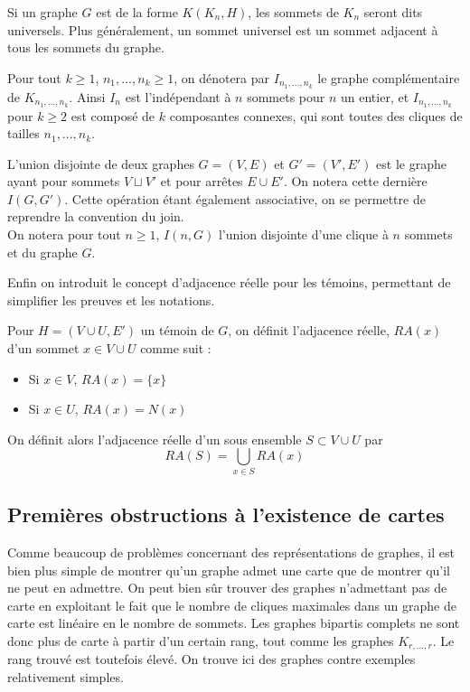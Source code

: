 \documentclass{scrartcl}
\begin{document}
\begin{flushleft}
Si un graphe $G$ est de la forme $K(K_n, H)$, les sommets de $K_n$ seront dits universels. Plus généralement, un sommet universel
est un sommet adjacent à tous les sommets du graphe.

\begin{def*}
    Pour tout $k \geq 1$, $n_1, ..., n_k \geq 1$, on dénotera par $I_{n_1, ..., n_k}$ le graphe complémentaire de $K_{n_1, ..., n_k}$.
    Ainsi $I_n$ est l'indépendant à $n$ sommets pour $n$ un entier, et $I_{n_1, ..., n_k}$ pour $k \geq 2$ est composé de $k$
    composantes connexes, qui sont toutes des cliques de tailles $n_1, ..., n_k$.
\end{def*}

\begin{def*}
    L'union disjointe de deux graphes $G = (V, E)$ et $G' = (V', E')$ est le graphe ayant pour sommets $V \sqcup V'$ et pour arrêtes
    $E \cup E'$. On notera cette dernière $I(G, G')$. Cette opération étant également associative, on se permettre de reprendre la
    convention du join.\\
    On notera pour tout $n \geq 1$, $I(n, G)$ l'union disjointe d'une clique à $n$ sommets et du graphe $G$.
\end{def*}

Enfin on introduit le concept d'adjacence réelle pour les témoins, permettant de simplifier les preuves et les notations.

\begin{def*}
    Pour $H = (V \cup U, E')$ un témoin de $G$, on définit l'adjacence réelle, $RA(x)$ d'un sommet $x \in V \cup U$ comme suit :
    \begin{itemize}
        \item Si $x \in V$, $RA(x) = \{x\}$
        \item Si $x \in U$, $RA(x) = N(x)$
    \end{itemize}
    On définit alors l'adjacence réelle d'un sous ensemble $S \subset V \cup U$ par
    \[ RA(S) = \bigcup_{x \in S} RA(x) \]
\end{def*}

\subsection{Premières obstructions à l'existence de cartes}

Comme beaucoup de problèmes concernant des représentations de graphes, il est bien plus simple de montrer qu'un graphe admet une
carte que de montrer qu'il ne peut en admettre. On peut bien sûr trouver des graphes n'admettant pas de carte en exploitant
le fait que le nombre de cliques maximales dans un graphe de carte est linéaire en le nombre de sommets. Les graphes bipartis
complets ne sont donc plus de carte à partir d'un certain rang, tout comme les graphes $K_{r,...,r}$. Le rang trouvé est toutefois
élevé. On trouve ici des graphes contre exemples relativement simples.


\end{flushleft}
\end{document}
